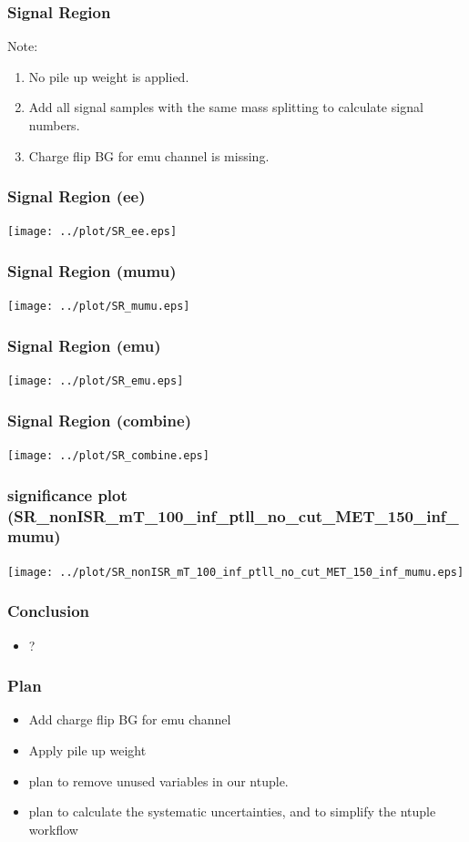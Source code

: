 \documentclass[mathserif,serif]{beamer}
\begin{document}
\begin{frame}
\frametitle{Signal Region}
Note:
\begin{enumerate}
\item No pile up weight is applied.
\item Add all signal samples with the same mass splitting to calculate signal numbers.
\item Charge flip BG for emu channel is missing.
\end{enumerate}
\end{frame}


\begin{frame}
\frametitle{Signal Region (ee)}
\texttt{[image: ../plot/SR\_ee.eps]}
\end{frame}

\begin{frame}
\frametitle{Signal Region (mumu)}
\texttt{[image: ../plot/SR\_mumu.eps]}
\end{frame}

\begin{frame}
\frametitle{Signal Region (emu)}
\texttt{[image: ../plot/SR\_emu.eps]}
\end{frame}

\begin{frame}
\frametitle{Signal Region (combine)}
\texttt{[image: ../plot/SR\_combine.eps]}
\end{frame}

\begin{frame}
\frametitle{significance plot (SR\_nonISR\_mT\_100\_inf\_ptll\_no\_cut\_MET\_150\_inf\_mumu)}
\texttt{[image: ../plot/SR\_nonISR\_mT\_100\_inf\_ptll\_no\_cut\_MET\_150\_inf\_mumu.eps]}
\end{frame}

%
%

\def \PathToPlot {../plot}
%


%

\begin{frame}
\frametitle{Conclusion}
\begin{itemize}
\item ?
\end{itemize}
\end{frame}

\begin{frame}
\frametitle{Plan}
\begin{itemize}
\item Add charge flip BG for emu channel
\item Apply pile up weight
\item plan to remove unused variables in our ntuple.
\item plan to calculate the systematic uncertainties, and to simplify the ntuple workflow
\end{itemize}
\end{frame}
\end{document}
